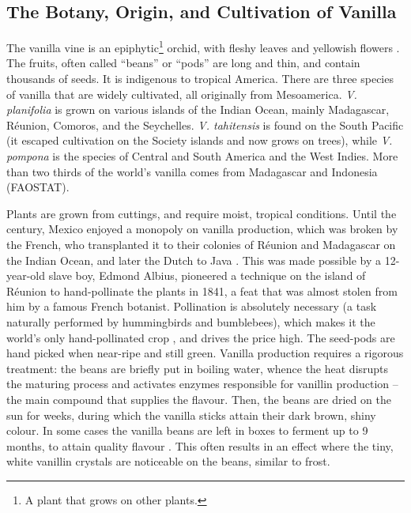 \subsection{The Botany, Origin, and Cultivation of Vanilla }

The vanilla vine is an epiphytic\footnote{A plant that grows on other plants.} orchid,  with fleshy leaves and yellowish flowers \parencite[282]{van_wyk_culinary_2014}. 
The fruits, often called ``beans'' or ``pods'' are long and thin, and contain thousands of seeds. It is indigenous to tropical America. There are three species of vanilla that are widely cultivated, all  originally from Mesoamerica. \textit{V. planifolia} is grown on various islands of the Indian Ocean, mainly Madagascar, Réunion, Comoros, and the Seychelles. \textit{V. tahitensis} is found on the South Pacific (it escaped cultivation on the Society islands and now grows on trees), while \textit{V. pompona} is the species of Central and South America and the West Indies. More than two thirds of the world's vanilla comes from Madagascar and Indonesia (FAOSTAT).

Plants are grown from cuttings, and require moist, tropical conditions. Until the  century, Mexico enjoyed a monopoly on vanilla production, which was broken by the French, who transplanted it to their colonies of Réunion and Madagascar on the Indian Ocean, and later the Dutch to Java \parencite[282]{van_wyk_culinary_2014}.
This was made possible by a 12-year-old slave boy, Edmond Albius, pioneered a technique on the island of Réunion to hand-pollinate the plants in 1841, a feat that was almost stolen from him by a famous French botanist. Pollination is absolutely necessary (a task naturally performed by hummingbirds and bumblebees), which makes it the world's only hand-pollinated crop \parencite[959]{mabberley_mabberleys_2017}, and drives the price high. The seed-pods are hand picked when near-ripe and still green. Vanilla production requires a rigorous treatment: the beans are briefly put in boiling water, whence the heat disrupts the maturing process and activates enzymes responsible for vanillin production -- the main compound that supplies the flavour. Then, the beans are dried on the sun for weeks, during which the vanilla sticks attain their dark brown, shiny colour. In some cases the vanilla beans are left in boxes to ferment up to 9 months, to attain quality flavour \parencite[282]{van_wyk_culinary_2014}. This often results in an effect where the tiny, white vanillin crystals are noticeable on the beans, similar to frost.



